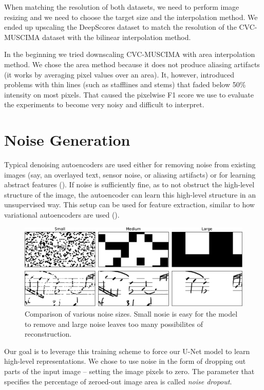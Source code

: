 When matching the resolution of both datasets, we need to perform image resizing and we need to choose the target size and the interpolation method. We ended up upscaling the DeepScores dataset to match the resolution of the CVC-MUSCIMA dataset with the bilinear interpolation method.

In the beginning we tried downscaling CVC-MUSCIMA with area interpolation method. We chose the area method because it does not produce aliasing artifacts (it works by averaging pixel values over an area). It, however, introduced problems with thin lines (such as stafflines and stems) that faded below 50\% intensity on most pixels. That caused the pixelwise F1 score we use to evaluate the experiments to become very noisy and difficult to interpret.


\section{Noise Generation}
\label{sec:NoiseGeneration}

Typical denoising autoencoders are used either for removing noise from existing images (say, an overlayed text, sensor noise, or aliasing artifacts) or for learning abstract features (\cite{StackedDenoisingAutoencoders}). If noise is sufficiently fine, as to not obstruct the high-level structure of the image, the autoencoder can learn this high-level structure in an unsupervised way. This setup can be used for feature extraction, similar to how variational autoencoders are used (\cite{VariationalAutoencoder}).

\begin{figure}[ht]
    \centering
    \includegraphics[width=145mm]{../../figures/06-noise/noise-comparison.pdf}
    \caption{Comparison of various noise sizes. Small nosie is easy for the model to remove and large noise leaves too many possibilites of reconstruction.}
    \label{fig:NoiseComparison}
\end{figure}

Our goal is to leverage this training scheme to force our U-Net model to learn high-level representations. We chose to use noise in the form of dropping out parts of the input image -- setting the image pixels to zero. The parameter that specifies the percentage of zeroed-out image area is called \emph{noise dropout}.

